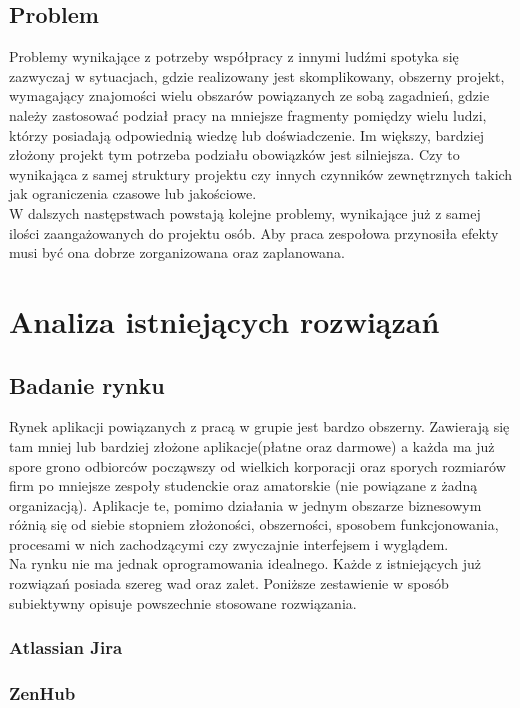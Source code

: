 \documentclass[eng,printmode]{mgr}
\begin{document}
\section{Problem}
Problemy wynikające z potrzeby współpracy z innymi ludźmi spotyka się zazwyczaj w sytuacjach, gdzie realizowany jest skomplikowany, obszerny projekt, wymagający znajomości wielu obszarów powiązanych ze sobą zagadnień, gdzie należy zastosować podział pracy na mniejsze fragmenty pomiędzy wielu ludzi, którzy posiadają odpowiednią wiedzę lub doświadczenie. Im większy, bardziej złożony projekt tym potrzeba podziału obowiązków jest silniejsza. Czy to wynikająca z samej struktury projektu czy innych czynników zewnętrznych takich jak ograniczenia czasowe lub jakościowe. \\
W dalszych następstwach powstają kolejne problemy, wynikające już z samej ilości zaangażowanych do projektu osób. Aby praca zespołowa przynosiła efekty musi być ona dobrze zorganizowana oraz zaplanowana.
\chapter{Analiza istniejących rozwiązań}  
\section{Badanie rynku}
Rynek aplikacji powiązanych z pracą w grupie jest bardzo obszerny. Zawierają się tam mniej lub bardziej złożone aplikacje(płatne oraz darmowe) a każda ma już spore grono odbiorców począwszy od wielkich korporacji oraz sporych rozmiarów firm po mniejsze zespoły studenckie oraz amatorskie (nie powiązane z żadną organizacją). Aplikacje te, pomimo działania w jednym obszarze biznesowym różnią się od siebie stopniem złożoności, obszerności, sposobem funkcjonowania, procesami w nich zachodzącymi czy zwyczajnie interfejsem i wyglądem.\\
Na rynku nie ma jednak oprogramowania idealnego. Każde z istniejących już rozwiązań posiada szereg wad oraz zalet. Poniższe zestawienie w sposób subiektywny opisuje powszechnie stosowane rozwiązania.
\subsection{Atlassian Jira}

\subsection{ZenHub}
\end{document}

